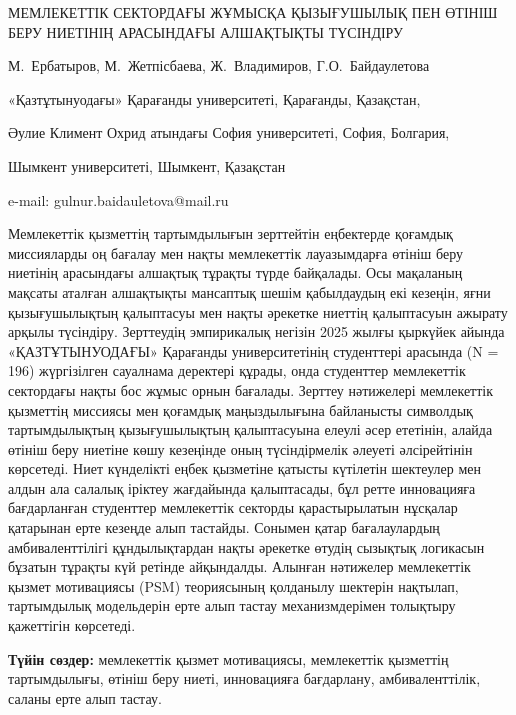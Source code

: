 \begin{header}
МЕМЛЕКЕТТІК СЕКТОРДАҒЫ ЖҰМЫСҚА ҚЫЗЫҒУШЫЛЫҚ ПЕН ӨТІНІШ БЕРУ НИЕТІНІҢ АРАСЫНДАҒЫ АЛШАҚТЫҚТЫ ТҮСІНДІРУ

М.~Ербатыров,
М.~Жетпісбаева,
Ж.~Владимиров,
Г.О.~Байдаулетова\envelope
\end{header}

\begin{affil}
«Қазтұтынуодағы» Қарағанды университеті, Қарағанды, Қазақстан,

Әулие Климент Охрид атындағы София университеті, София, Болгария,

Шымкент университеті, Шымкент, Қазақстан

e-mail: gulnur.baidauletova@mail.ru
\end{affil}

Мемлекеттік қызметтің тартымдылығын зерттейтін еңбектерде қоғамдық
миссияларды оң бағалау мен нақты мемлекеттік лауазымдарға өтініш беру
ниетінің арасындағы алшақтық тұрақты түрде байқалады. Осы мақаланың
мақсаты аталған алшақтықты мансаптық шешім қабылдаудың екі кезеңін, яғни
қызығушылықтың қалыптасуы мен нақты әрекетке ниеттің қалыптасуын ажырату
арқылы түсіндіру. Зерттеудің эмпирикалық негізін 2025 жылғы қыркүйек
айында «ҚАЗТҰТЫНУОДАҒЫ» Қарағанды университетінің студенттері арасында
(N = 196) жүргізілген сауалнама деректері құрады, онда студенттер
мемлекеттік сектордағы нақты бос жұмыс орнын бағалады. Зерттеу
нәтижелері мемлекеттік қызметтің миссиясы мен қоғамдық маңыздылығына
байланысты символдық тартымдылықтың қызығушылықтың қалыптасуына елеулі
әсер ететінін, алайда өтініш беру ниетіне көшу кезеңінде оның
түсіндірмелік әлеуеті әлсірейтінін көрсетеді. Ниет күнделікті еңбек
қызметіне қатысты күтілетін шектеулер мен алдын ала салалық іріктеу
жағдайында қалыптасады, бұл ретте инновацияға бағдарланған студенттер
мемлекеттік секторды қарастырылатын нұсқалар қатарынан ерте кезеңде алып
тастайды. Сонымен қатар бағалаулардың амбиваленттілігі құндылықтардан
нақты әрекетке өтудің сызықтық логикасын бұзатын тұрақты күй ретінде
айқындалды. Алынған нәтижелер мемлекеттік қызмет мотивациясы (PSM)
теориясының қолданылу шектерін нақтылап, тартымдылық модельдерін ерте
алып тастау механизмдерімен толықтыру қажеттігін көрсетеді.

{\bfseries Түйін сөздер:} мемлекеттік қызмет мотивациясы, мемлекеттік
қызметтің тартымдылығы, өтініш беру ниеті, инновацияға бағдарлану,
амбиваленттілік, саланы ерте алып тастау.

